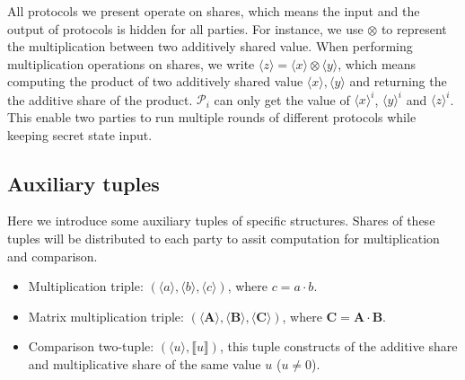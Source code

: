\documentclass[letterpaper]{article} %
\begin{document}
    All protocols we present operate on shares, which means
    the input and the output of protocols is hidden for all parties.
    For instance, we use $\otimes$ to represent the multiplication between two additively shared value.
    When performing multiplication operations on shares,
    we write $\langle z\rangle=\langle x\rangle\otimes  \langle y\rangle $,
    which means computing the product of two additively shared value $\langle x\rangle, \langle y\rangle$ and returning the
    the additive share of the product.
    $\mathcal{P}_{i}$ can only get the value of $\langle x\rangle ^{i}$, $\langle y\rangle ^{i}$ and $\langle z\rangle ^{i}$.
    This enable two parties to run multiple rounds of different protocols
    while keeping secret state input.

    \subsection{Auxiliary tuples}
    Here we introduce some auxiliary tuples of specific structures.
    Shares of these tuples will be distributed to each party to
    assit computation for multiplication and comparison.
    \begin{itemize}
        \item Multiplication triple: $(\langle a\rangle,\langle b\rangle,\langle c\rangle)$, where $c=a\cdot b$.
        \item Matrix multiplication triple: $(\langle \mathbf{A}\rangle,\langle \mathbf{B}\rangle,\langle \mathbf{C}\rangle)$, where $\mathbf{C}=\mathbf{A}\cdot \mathbf{B}$.
        \item Comparison two-tuple: $(\langle u\rangle,\llbracket u \rrbracket)$,
        this tuple constructs of the additive share and multiplicative share of the same value $u$ ($u\neq 0 $).
    \end{itemize}
\end{document}
